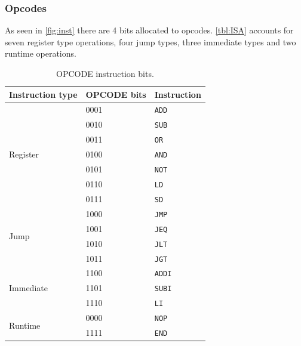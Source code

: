 \documentclass[a4paper, english]{article}
\numberwithin{equation}{section}
\begin{document}
\subsubsection{Opcodes}
As seen in \cref{fig:inst} there are 4 bits allocated to opcodes. \cref{tbl:ISA} accounts for seven register type operations, four jump types, three immediate types and two runtime operations.
\begin{table}[H]
    \centering
    \caption{OPCODE instruction bits.}\label{tbl:opcode}
    \begin{tabular}{lll}
        \toprule
        Instruction type           & OPCODE bits & Instruction   \\
        \midrule
        \multirow{7}{*}{Register}  & 0001        & \texttt{ADD}  \\
                                   & 0010        & \texttt{SUB}  \\
                                   & 0011        & \texttt{OR}   \\
                                   & 0100        & \texttt{AND}  \\
                                   & 0101        & \texttt{NOT}  \\
                                   & 0110        & \texttt{LD}   \\
                                   & 0111        & \texttt{SD}   \\
        \midrule
        \multirow{4}{*}{Jump}      & 1000        & \texttt{JMP}  \\
                                   & 1001        & \texttt{JEQ}  \\
                                   & 1010        & \texttt{JLT}  \\
                                   & 1011        & \texttt{JGT}  \\
        \midrule
        \multirow{3}{*}{Immediate} & 1100        & \texttt{ADDI} \\
                                   & 1101        & \texttt{SUBI} \\
                                   & 1110        & \texttt{LI}   \\
        \midrule
        \multirow{2}{*}{Runtime}   & 0000        & \texttt{NOP}  \\
                                   & 1111        & \texttt{END}  \\
        \bottomrule
    \end{tabular}
\end{table}
\end{document}
